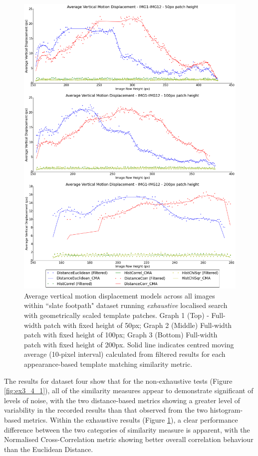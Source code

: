 \clearpage
\begin{figure}[ht!]
\centering
\includegraphics[scale=0.3]{images/results/path_outside_10cm_scaled_exhaustive}
\caption{Average vertical motion displacement models across all images within ``slate footpath" dataset running \textit{exhaustive} localised search with geometrically scaled template patches. Graph 1 (Top) - Full-width patch with fixed height of 50px; Graph 2 (Middle) Full-width patch with fixed height of 100px; Graph 3 (Bottom) Full-width patch with fixed height of 200px. Solid line indicates centred moving average (10-pixel interval) calculated from filtered results for each appearance-based template matching similarity metric.}
\label{fig:ex3_4_2}
\end{figure}

The results for dataset four show that for the non-exhaustive tests (Figure \ref{fig:ex3_4_1}), all of the similarity measures appear to demonstrate significant of levels of noise, with the two distance-based metrics showing a greater level of variability in the recorded results than that observed from the two histogram-based metrics. Within the exhaustive results (Figure \ref{fig:ex3_4_2}), a clear performance difference between the two categories of similarity measure is apparent, with the Normalised Cross-Correlation metric showing better overall correlation behaviour than the Euclidean Distance.


